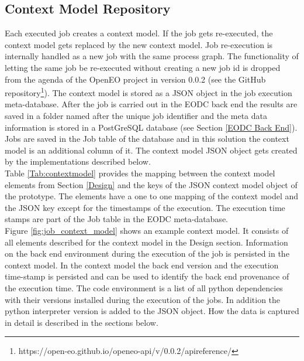 \documentclass[draft,final]{vutinfth} %
\begin{document}
\subsection{Context Model Repository}\label{Implementation:Provenance Repository}
Each executed job creates a context model. If the job gets re-executed, the context model gets replaced by the new context model. Job re-execution is internally handled as a new job with the same process graph. The functionality of letting the same job be re-executed without creating a new job id is dropped from the agenda of the OpenEO project in version 0.0.2 (see the GitHub repository\footnote{https://open-eo.github.io/openeo-api/v/0.0.2/apireference/}). 
The context model is stored as a JSON object in the job execution meta-database. After the job is carried out in the EODC back end the results are saved in a folder named after the unique job identifier and the meta data information is stored in a PostGreSQL database (see Section \ref{EODC Back End}). Jobs are saved in the Job table of the database and in this solution the context model is an additional column of it. The context model JSON object gets created by the implementations described below. \\
Table \ref{Tab:contextmodel} provides the mapping between the context model elements from Section \ref{Design} and the keys of the JSON context model object of the prototype. The elements have a one to one mapping of the context model and the JSON key except for the timestamps of the execution. The execution time stamps are part of the Job table in the EODC meta-database. \\
Figure \ref{fig:job_context_model} shows an example context model. It consists of all elements described for the context model in the Design section. Information on the back end environment during the execution of the job is persisted in the context model. In the context model the back end version and the execution time-stamp is persisted and can be used to identify the back end provenance of the execution time. The code environment is a list of all python dependencies with their versions installed during the execution of the jobs. In addition the python interpreter version is added to the JSON object. How the data is captured in detail is described in the sections below.    
 
 
\end{document}
